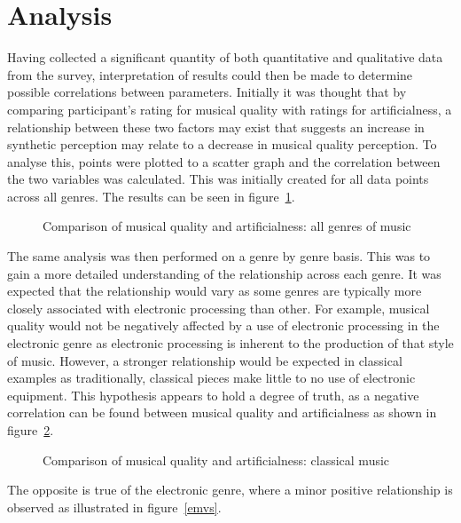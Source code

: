 \documentclass[titlepage]{scrartcl}
\begin{document}
    \section{Analysis}\label{analysis}
    Having collected a significant quantity of both quantitative and
    qualitative data from the survey, interpretation of results could then be
    made to determine possible correlations between parameters. Initially it
    was thought that by comparing participant's rating for musical quality with
    ratings for artificialness, a relationship between these two factors may
    exist that suggests an increase in synthetic perception may relate to a
    decrease in musical quality perception. To analyse this, points were
    plotted to a scatter graph and the correlation between the two variables
    was calculated. This was initially created for all data points across all
    genres. The results can be seen in figure~\ref{agmvs}.
    \begin{figure}[H]
        \caption{Comparison of musical quality and artificialness: all genres of music}
        \label{agmvs}
    \end{figure}
    The same analysis was then performed on a genre by genre basis. This was to
    gain a more detailed understanding of the relationship across each genre.
    It was expected that the relationship would vary as some genres are
    typically more closely associated with electronic processing than other.
    For example, musical quality would not be negatively affected by a use of
    electronic processing in the electronic genre as electronic processing is
    inherent to the production of that style of music. However, a stronger
    relationship would be expected in classical examples as traditionally,
    classical pieces make little to no use of electronic equipment. This
    hypothesis appears to hold a degree of truth, as a negative correlation can
    be found between musical quality and artificialness as shown in
    figure~\ref{cmvs}.

    \begin{figure}[H]
        \caption{Comparison of musical quality and artificialness: classical music}
        \label{cmvs}
    \end{figure}
    The opposite is true of the electronic genre, where a minor positive
    relationship is observed as illustrated in figure~\ref{emvs}.
\end{document}
